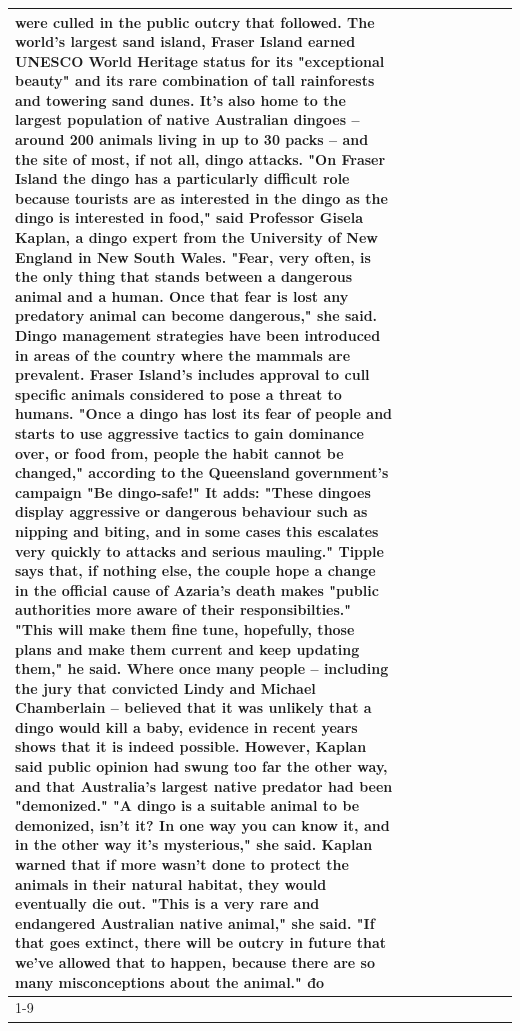 \begin{table}[H]
\begin{tabular}{lllrlllll}
were culled in the public outcry that followed. The world's largest sand island, Fraser Island earned UNESCO World Heritage status for its "exceptional beauty" and its rare combination of tall rainforests and towering sand dunes. It's also home to the largest population of native Australian dingoes -- around 200 animals living in up to 30 packs -- and the site of most, if not all, dingo attacks. "On Fraser Island the dingo has a particularly difficult role because tourists are as interested in the dingo as the dingo is interested in food," said Professor Gisela Kaplan, a dingo expert from the University of New England in New South Wales. "Fear, very often, is the only thing that stands between a dangerous animal and a human. Once that fear is lost any predatory animal can become dangerous," she said. Dingo management strategies have been introduced in areas of the country where the mammals are prevalent. Fraser Island's includes approval to cull specific animals considered to pose a threat to humans. "Once a dingo has lost its fear of people and starts to use aggressive tactics to gain dominance over, or food from, people the habit cannot be changed," according to the Queensland government's campaign "Be dingo-safe!" It adds: "These dingoes display aggressive or dangerous behaviour such as nipping and biting, and in some cases this escalates very quickly to attacks and serious mauling." Tipple says that, if nothing else, the couple hope a change in the official cause of Azaria's death makes "public authorities more aware of their responsibilties." "This will make them fine tune, hopefully, those plans and make them current and keep updating them," he said. Where once many people -- including the jury that convicted Lindy and Michael Chamberlain -- believed that it was unlikely that a dingo would kill a baby, evidence in recent years shows that it is indeed possible. However, Kaplan said public opinion had swung too far the other way, and that Australia's largest native predator had been "demonized." "A dingo is a suitable animal to be demonized, isn't it? In one way you can know it, and in the other way it's mysterious," she said. Kaplan warned that if more wasn't done to protect the animals in their natural habitat, they would eventually die out. "This is a very rare and endangered Australian native animal," she said. "If that goes extinct, there will be outcry in future that we've allowed that to happen, because there are so many misconceptions about the animal." đo \\
\cline{1-9}

\end{tabular}
\end{table}
